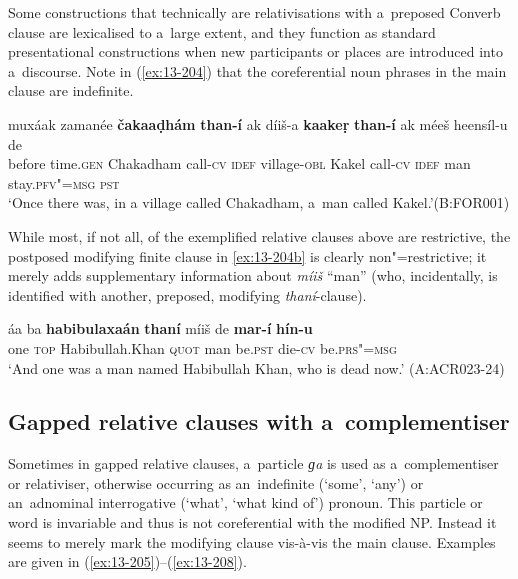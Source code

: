 Some constructions that technically are relativisations with a~preposed Converb clause are lexicalised to a~large extent, and they function as standard presentational constructions when new participants or places are introduced into a~discourse. Note in (\ref{ex:13-204}) that the coreferential noun phrases in the main clause are indefinite.

\begin{exe}
\ex
\label{ex:13-204}
\gll muxáak zamanée \textbf{čakaaḍhám} \textbf{than-í} ak díiš-a \textbf{kaakeṛ} \textbf{than-í} ak méeš heensíl-u de\\
before time.\textsc{gen} Chakadham call-\textsc{cv} \textsc{idef} village-\textsc{obl}  Kakel call-\textsc{cv} \textsc{idef} man stay.\textsc{pfv"=msg} \textsc{pst}\\
\glt `Once there was, in a village called Chakadham, a~man called Kakel.'\newline (B:FOR001)
\end{exe}


While most, if not all, of the exemplified relative clauses above are restrictive, the postposed modifying finite clause in \ref{ex:13-204b} is clearly non"=restrictive; it merely adds supplementary information about \textit{míiš} ``man'' (who, incidentally, is identified with another, preposed, modifying \textit
{thaní}-clause). 

\begin{exe}
\ex
\label{ex:13-204b}
\gll áa ba \textbf{habibulaxaán} \textbf{thaní} míiš de \textbf{mar-í} \textbf{hín-u}\\
one \textsc{top} Habibullah.Khan \textsc{quot} man be.\textsc{pst}   die-\textsc{cv} be.\textsc{prs"=msg}\\
\glt `And one was a man named Habibullah Khan, who is dead now.' (A:ACR023-24)
\end{exe}



\subsection{Gapped relative clauses with a~complementiser}
\label{subsec:13-6-4}


Sometimes in gapped relative clauses, a~particle \textit{ɡa} is used as a~complementiser or relativiser, otherwise occurring as an~indefinite (`some', `any') or an~adnominal interrogative (`what', `what kind of') pronoun. This particle or word is invariable and thus is not coreferential with the modified NP. Instead it seems to merely mark the modifying clause vis-à-vis the main clause. Examples are given in (\ref{ex:13-205})--(\ref{ex:13-208}).


